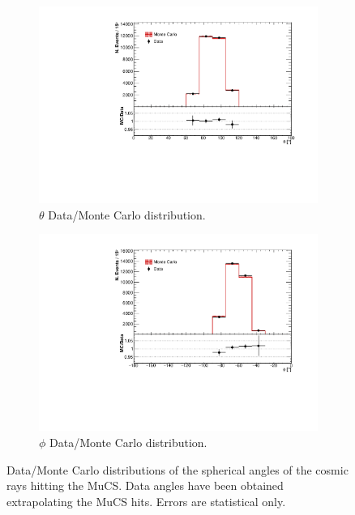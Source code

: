 \documentclass[a4paper]{scrartcl}
\begin{document}
\begin{figure}[htbp]
  \begin{subfigure}{0.52\textwidth}
    \includegraphics[width=\linewidth]{figures/theta.pdf}
    \caption{$\theta$ Data/Monte Carlo distribution.} \label{fig:xy_mucs}
  \end{subfigure}
  \begin{subfigure}{0.52\textwidth}
    \includegraphics[width=\linewidth]{figures/phi.pdf}
    \caption{$\phi$ Data/Monte Carlo distribution.} \label{fig:yzmucs}
  \end{subfigure}
  \caption{Data/Monte Carlo distributions of the spherical angles of the cosmic rays hitting the MuCS. Data angles have been obtained extrapolating the MuCS hits. Errors are statistical only.} \label{fig:mucs_angles}


\end{figure}
\end{document}
